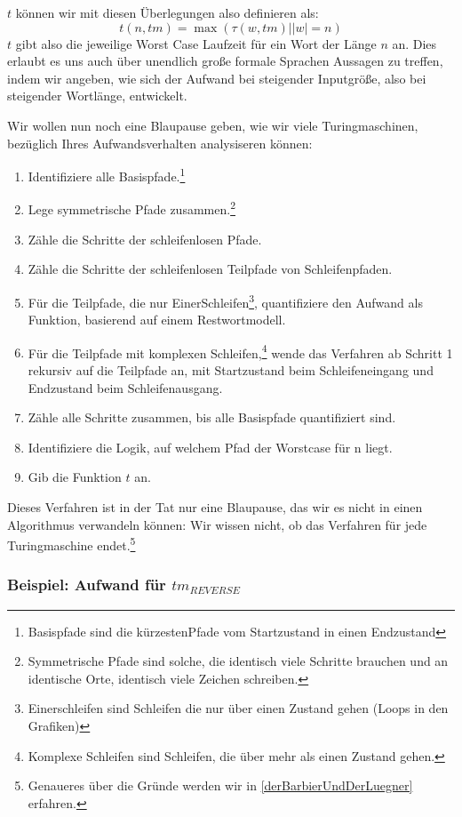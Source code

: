 $t$ können wir mit diesen Überlegungen also definieren als:
\[
t(n, tm) = \max({\tau(w, tm)| |w| = n})
\]
$t$ gibt also die jeweilige Worst Case Laufzeit für ein Wort der Länge $n$ an.
Dies erlaubt es uns auch über unendlich große formale Sprachen Aussagen zu treffen,
indem wir angeben,
wie sich der Aufwand bei steigender Inputgröße,
also bei steigender Wortlänge, entwickelt.

Wir wollen nun noch eine Blaupause geben,
wie wir viele Turingmaschinen,
bezüglich Ihres Aufwandsverhalten analysiseren können:
\begin{enumerate}
    \item Identifiziere alle Basispfade.\footnote{%
            Basispfade sind die kürzestenPfade vom Startzustand in einen Endzustand}
    \item Lege symmetrische Pfade zusammen.\footnote{%
            Symmetrische Pfade sind solche,
            die identisch viele Schritte brauchen und an identische Orte,
            identisch viele Zeichen schreiben.}
    \item Zähle die Schritte der schleifenlosen Pfade.
    \item Zähle die Schritte der schleifenlosen Teilpfade von Schleifenpfaden.
    \item Für die Teilpfade, die nur EinerSchleifen\footnote{%
            Einerschleifen sind Schleifen die nur über einen Zustand gehen (Loops in den Grafiken)},
        quantifiziere den Aufwand als Funktion, basierend auf einem Restwortmodell.
    \item Für die Teilpfade mit komplexen Schleifen,\footnote{%
            Komplexe Schleifen sind Schleifen, die über mehr als einen Zustand gehen.}
            wende das Verfahren ab Schritt 1
        rekursiv auf die Teilpfade an, mit Startzustand beim Schleifeneingang
        und Endzustand beim Schleifenausgang.
    \item Zähle alle Schritte zusammen, bis alle Basispfade quantifiziert sind.
    \item Identifiziere die Logik, auf welchem Pfad der Worstcase für n liegt.
    \item Gib die Funktion $t$ an.
\end{enumerate}
Dieses Verfahren ist in der Tat nur eine Blaupause,
das wir es nicht in einen Algorithmus verwandeln können:
Wir wissen nicht, ob das Verfahren für jede Turingmaschine endet.\footnote{%
    Genaueres über die Gründe werden wir in \autoref{derBarbierUndDerLuegner} erfahren.}

\subsubsection{Beispiel: Aufwand für $tm_{REVERSE}$}

